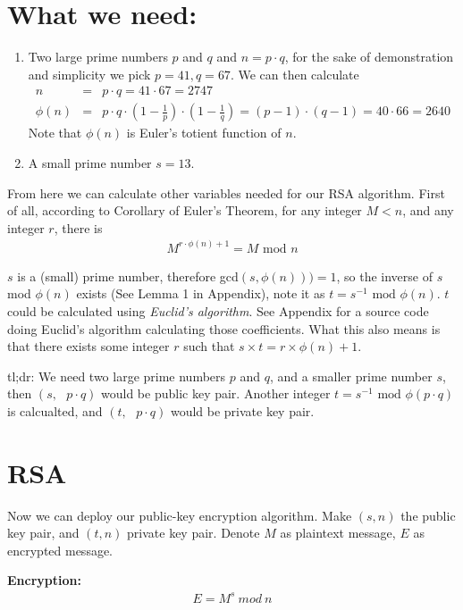 \documentclass[]{paper}
\begin{document}
\section*{\large What we need:}
\begin{enumerate}
    \item Two large prime numbers $p$ and $q$ and $n = p\cdot q$, for the sake of demonstration and simplicity we pick $p = 41, q = 67$. We can then calculate
\begin{eqnarray*}
n &=& p \cdot q = 41 \cdot 67 = 2747 \\
\phi(n) &=& p\cdot q \cdot (1- \frac{1}{p})\cdot (1-\frac{1}{q})= (p-1)\cdot(q-1) = 40 \cdot 66 = 2640
\end{eqnarray*}
Note that $\phi(n)$ is Euler's totient function of $n$.
    \item A small prime number $s=13$.
\end{enumerate}


From here we can calculate other variables needed for our RSA algorithm. First of all, according to Corollary of Euler's Theorem, for any integer $M < n$, and any integer $r$, there is
\begin{align*}
    M^{r\cdot\phi(n) + 1} = M \text{ mod } n
\end{align*}

$s$ is a (small) prime number, therefore gcd$(s, \phi(n)))=1$, so the inverse of $s$ mod $\phi(n)$ exists (See Lemma 1 in Appendix), note it as $t = s^{-1}\text{ mod } \phi(n)$. $t$ could be calculated using \emph{Euclid's algorithm}. See Appendix for a source code doing Euclid's algorithm calculating those coefficients. What this also means is that there exists some integer $r$ such that $s\times t = r\times\phi(n)+1$.

tl;dr: We need two large prime numbers $p$ and $q$, and a smaller prime number $s$, then $(s,\text{ }p\cdot q)$ would be public key pair. Another integer $t = s^{-1}\text{ mod }\phi(p\cdot q)$ is calcualted, and $(t,\text{ }p\cdot q)$ would be private key pair.
\section*{RSA}
Now we can deploy our public-key encryption algorithm. Make $(s,n)$ the public key pair, and $(t,n)$ private key pair. Denote $M$ as plaintext message, $E$ as encrypted message.

\textbf{Encryption:}
\begin{eqnarray*}
E = M^s\ mod\ n
\end{eqnarray*}
\end{document}
